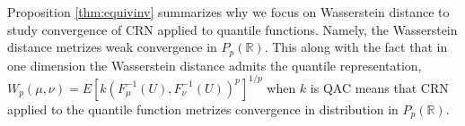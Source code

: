 \documentclass[12pt]{article}
\theoremstyle{plain}%
\newtheorem{theorem}{Theorem}[section]
\theoremstyle{definition}
\begin{document}


%	

Proposition \ref{thm:equivinv} summarizes why we focus on Wasserstein distance to study convergence of CRN applied to quantile functions. Namely, the Wasserstein distance metrizes weak convergence in $P_p(\mathbb{R})$. This along with the fact that in one dimension the Wasserstein distance admits the quantile representation, $W_p(\mu,\nu)
= E[k(F_\mu^{-1}(U), F_\nu^{-1}(U))^p]^{1/p}$ when $k$ is QAC means that CRN applied to the quantile function metrizes convergence in distribution in $P_p(\mathbb{R})$. 


\end{document}
